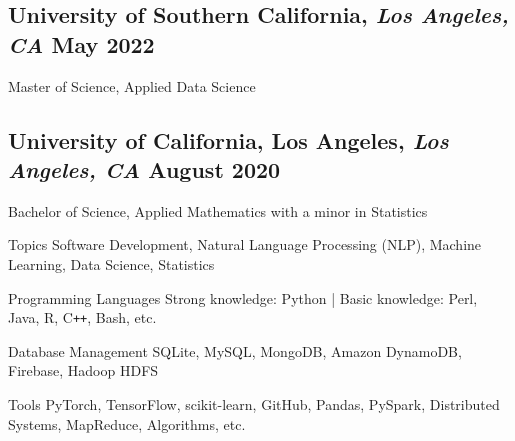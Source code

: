 \documentclass[11pt]{article}
\begin{document}
\vspace{0.1in}

\subsection*{University of Southern California{\normalfont, \textit{Los Angeles, CA} \hfill May 2022}}
\noindent
Master of Science, Applied Data Science

\subsection*{University of California, Los Angeles{\normalfont, \textit{Los Angeles, CA} \hfill August 2020}}
\noindent
Bachelor of Science, Applied Mathematics with a minor in Statistics

\vspace{0.1in}

\vspace{0.05in}
\begin{compactdesc}
	\item[Topics] Software Development, Natural Language Processing (NLP), Machine Learning, Data Science, Statistics
    \item[Programming Languages] Strong knowledge: Python | Basic knowledge: Perl, Java, R, C\texttt{++}, Bash, etc.
    \item[Database Management] SQLite, MySQL, MongoDB, Amazon DynamoDB, Firebase, Hadoop HDFS
    \item[Tools] PyTorch, TensorFlow, scikit-learn, GitHub, Pandas, PySpark, Distributed Systems, MapReduce, Algorithms, etc.
\end{compactdesc}
\end{document}
